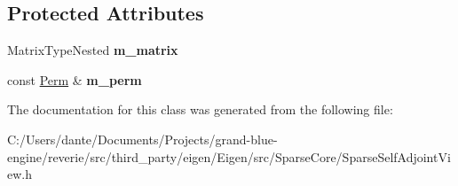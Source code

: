 \subsection*{Protected Attributes}
\begin{DoxyCompactItemize}
\item 
\mbox{\label{class_eigen_1_1_sparse_symmetric_permutation_product_a86bcaab40d1d3e5814e10207e624a11a}} 
Matrix\+Type\+Nested {\bfseries m\+\_\+matrix}
\item 
\mbox{\label{class_eigen_1_1_sparse_symmetric_permutation_product_af8005198017f9379c283ff9bd45851c1}} 
const \mbox{\hyperlink{class_eigen_1_1_permutation_matrix}{Perm}} \& {\bfseries m\+\_\+perm}
\end{DoxyCompactItemize}


The documentation for this class was generated from the following file\+:\begin{DoxyCompactItemize}
\item 
C\+:/\+Users/dante/\+Documents/\+Projects/grand-\/blue-\/engine/reverie/src/third\+\_\+party/eigen/\+Eigen/src/\+Sparse\+Core/Sparse\+Self\+Adjoint\+View.\+h\end{DoxyCompactItemize}
